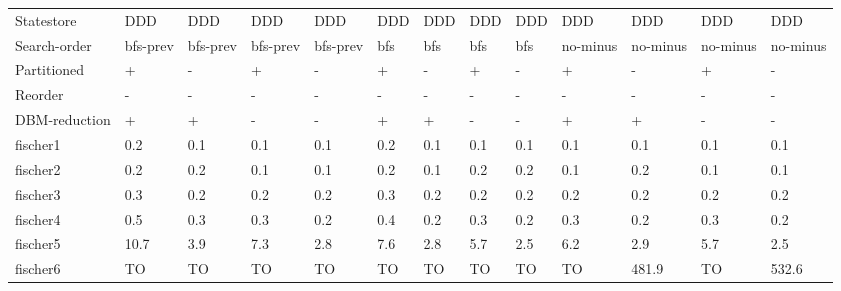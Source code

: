 \begin{table}
\label{fig:time_1}
\begin{adjustbox}{max totalheight=\textheight}
    \begin{tabular}{|l|llllllllllll|}
    \hline
     Statestore        & DDD      & DDD      & DDD      & DDD      & DDD   & DDD  & DDD   & DDD  & DDD               & DDD               & DDD               & DDD               \\
    Search-order       & bfs-prev & bfs-prev & bfs-prev & bfs-prev & bfs   & bfs  & bfs   & bfs  & no-minus & no-minus & no-minus & no-minus \\
    Partitioned        & +        & -        & +        & -        & +     & -    & +     & -    & +                 & -                 & +                 & -                 \\
    Reorder            & -        & -        & -        & -        & -     & -    & -     & -    & -                 & -                 & -                 & -                 \\
    DBM-reduction      & +        & +        & -        & -        & +     & +    & -     & -    & +                 & +                 & -                 & -                 \\ \hline
    fischer1           & 0.2      & 0.1      & 0.1      & 0.1      & 0.2   & 0.1  & 0.1   & 0.1  & 0.1               & 0.1               & 0.1               & 0.1               \\
    fischer2           & 0.2      & 0.2      & 0.1      & 0.1      & 0.2   & 0.1  & 0.2   & 0.2  & 0.1               & 0.2               & 0.1               & 0.1               \\
    fischer3           & 0.3      & 0.2      & 0.2      & 0.2      & 0.3   & 0.2  & 0.2   & 0.2  & 0.2               & 0.2               & 0.2               & 0.2               \\
    fischer4           & 0.5      & 0.3      & 0.3      & 0.2      & 0.4   & 0.2  & 0.3   & 0.2  & 0.3               & 0.2               & 0.3               & 0.2               \\
    fischer5           & 10.7     & 3.9      & 7.3      & 2.8      & 7.6   & 2.8  & 5.7   & 2.5  & 6.2               & 2.9               & 5.7               & 2.5               \\
    fischer6           & TO       & TO       & TO       & TO       & TO    & TO   & TO    & TO   & TO                & 481.9             & TO                & 532.6             \\ \hline

\end{tabular}
\end{adjustbox}
\end{table}
